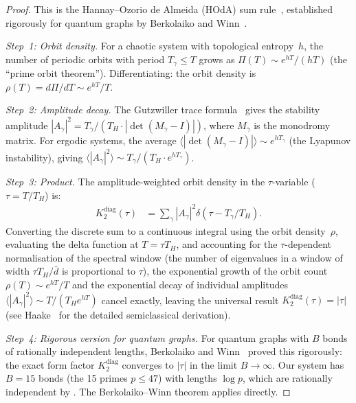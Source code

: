 \documentclass[11pt,a4paper]{article}
\theoremstyle{plain}
\theoremstyle{remark}
\begin{document}
\begin{proof}
This is the Hannay--Ozorio de Almeida (HOdA) sum
rule~\cite{hannay-ozorio1984}, established rigorously for quantum
graphs by Berkolaiko and Winn~\cite{berkolaiko-winn2010}.

\emph{Step~1: Orbit density.}
For a chaotic system with topological entropy~$h$, the number of periodic
orbits with period $T_\gamma\leq T$ grows as
$\Pi(T)\sim e^{hT}/(hT)$ (the ``prime orbit theorem'').
Differentiating: the orbit density is $\rho(T)=d\Pi/dT\sim e^{hT}/T$.

\emph{Step~2: Amplitude decay.}
The Gutzwiller trace formula~\cite{gutzwiller1990} gives the stability
amplitude $|A_\gamma|^2=T_\gamma/(T_H\cdot|\det(M_\gamma-I)|)$, where
$M_\gamma$ is the monodromy matrix.  For ergodic systems, the average
$\langle|\det(M_\gamma-I)|\rangle\sim e^{hT_\gamma}$ (the Lyapunov
instability), giving
$\langle|A_\gamma|^2\rangle\sim T_\gamma/(T_H\cdot e^{hT_\gamma})$.


\emph{Step~3: Product.}
The amplitude-weighted orbit density in the $\tau$-variable ($\tau=T/T_H$) is:
\begin{align*}
  K_2^{\mathrm{diag}}(\tau)
  &=\sum_\gamma|A_\gamma|^2\delta(\tau-T_\gamma/T_H).
\end{align*}
Converting the discrete sum to a continuous integral using the orbit
density~$\rho$, evaluating the delta function at $T=\tau T_H$, and
accounting for the $\tau$-dependent normalisation of the spectral window
(the number of eigenvalues in a window of width $\tau T_H/\bar{d}$ is
proportional to $\tau$), the exponential growth of the orbit count
$\rho(T)\sim e^{hT}/T$ and the exponential decay of individual amplitudes
$\langle|A_\gamma|^2\rangle\sim T/(T_H e^{hT})$ cancel exactly, leaving
the universal result $K_2^{\mathrm{diag}}(\tau)=|\tau|$
(see Haake~\cite{haake2010} for the detailed semiclassical derivation).

\emph{Step~4: Rigorous version for quantum graphs.}
For quantum graphs with $B$ bonds of rationally independent lengths,
Berkolaiko and Winn~\cite{berkolaiko-winn2010} proved this rigorously:
the exact form factor $K_2^{\mathrm{diag}}$ converges to $|\tau|$ in the
limit $B\to\infty$.  Our system has $B=15$ bonds (the 15 primes $p\leq 47$)
with lengths $\log p$, which are rationally independent by
.  The Berkolaiko--Winn theorem applies
directly.
\end{proof}
\end{document}
